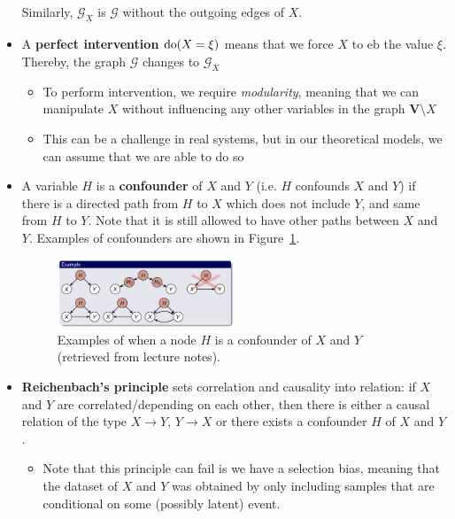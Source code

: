 \begin{itemize}
	Similarly, $\mathcal{G}_{\underline{X}}$ is $\mathcal{G}$ without the outgoing edges of $X$.
	\item  A \textbf{perfect intervention} $\textnormal{do}(X=\xi)$ means that we force $X$ to eb the value $\xi$. Thereby, the graph $\mathcal{G}$ changes to $\mathcal{G}_{\overline{X}}$
	\begin{itemize}
		\item To perform intervention, we require \textit{modularity}, meaning that we can manipulate $X$ without influencing any other variables in the graph $\bm{V}\setminus X$
		\item This can be a challenge in real systems, but in our theoretical models, we can assume that we are able to do so
	\end{itemize}
	\item A variable $H$ is a \textbf{confounder} of $X$ and $Y$ (i.e. $H$ confounds $X$ and $Y$) if there is a directed path from $H$ to $X$ which does not include $Y$, and same from $H$ to $Y$. Note that it is still allowed to have other paths between $X$ and $Y$. Examples of confounders are shown in Figure~\ref{fig:causality_confounders_examples}.
	
	\begin{figure}[ht!]
		\centering
		\includegraphics[width=0.5\textwidth]{figures/causality_confounders_examples.png}
		\caption{Examples of when a node $H$ is a confounder of $X$ and $Y$ (retrieved from lecture notes).}
		\label{fig:causality_confounders_examples}
	\end{figure}

	\item \textbf{Reichenbach's principle} sets correlation and causality into relation: if $X$ and $Y$ are correlated/depending on each other, then there is either a causal relation of the type $X\to Y$, $Y\to X$ or there exists a confounder $H$ of $X$ and $Y$.
	\begin{itemize}
		\item Note that this principle can fail is we have a selection bias, meaning that the dataset of $X$ and $Y$ was obtained by only including samples that are conditional on some (possibly latent) event.
	\end{itemize}
\end{itemize}

